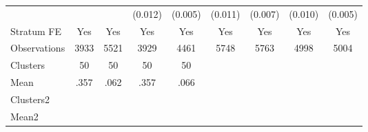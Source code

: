 {\begin{tabular}{l*{8}{c}}
                &                  &                  &  (0.012)         &  (0.005)         &  (0.011)         &  (0.007)         &  (0.010)         &  (0.005)         \\
Stratum FE      &      Yes         &      Yes         &      Yes         &      Yes         &      Yes         &      Yes         &      Yes         &      Yes         \\
\hline
Observations    &     3933         &     5521         &     3929         &     4461         &     5748         &     5763         &     4998         &     5004         \\
Clusters        &       50         &       50         &       50         &       50         &                  &                  &                  &                  \\
Mean            &     .357         &     .062         &     .357         &     .066         &                  &                  &                  &                  \\
Clusters2       &                  &                  &                  &                  &                  &                  &                  &                  \\
Mean2           &                  &                  &                  &                  &                  &                  &                  &                  \\
\hline\hline
\end{tabular}
}
